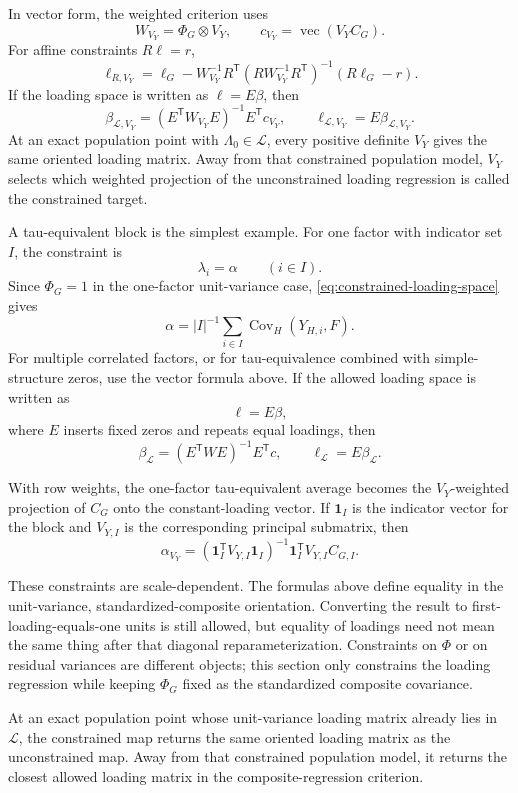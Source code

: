 \documentclass[11pt]{article}
\newcommand{\T}{^{\mathsf T}}
\newcommand{\Cov}{\operatorname{Cov}}
\theoremstyle{plain}
\theoremstyle{remark}
\begin{document}
In vector form, the weighted criterion uses
\[
  W_{V_Y}=\Phi_G\otimes V_Y,
  \qquad
  c_{V_Y}=\operatorname{vec}(V_YC_G).
\]
For affine constraints \(R\ell=r\),
\[
  \ell_{R,V_Y}
  =
  \ell_G
  -
  W_{V_Y}^{-1}R\T(RW_{V_Y}^{-1}R\T)^{-1}(R\ell_G-r).
\]
If the loading space is written as \(\ell=E\beta\), then
\[
  \beta_{\mathcal L,V_Y}
  =
  (E\T W_{V_Y}E)^{-1}E\T c_{V_Y},
  \qquad
  \ell_{\mathcal L,V_Y}=E\beta_{\mathcal L,V_Y}.
\]
At an exact population point with \(\Lambda_0\in\mathcal L\), every positive
definite \(V_Y\) gives the same oriented loading matrix. Away from that
constrained population model, \(V_Y\) selects which weighted projection of the
unconstrained loading regression is called the constrained target.

A tau-equivalent block is the simplest example. For one factor with indicator
set \(I\), the constraint is
\[
  \lambda_i=\alpha\qquad(i\in I).
\]
Since \(\Phi_G=1\) in the one-factor unit-variance case,
\eqref{eq:constrained-loading-space} gives
\[
  \alpha
  =
  |I|^{-1}\sum_{i\in I}\Cov_H(Y_{H,i},F).
\]
For multiple correlated factors, or for tau-equivalence combined with
simple-structure zeros, use the vector formula above. If the allowed loading
space is written as
\[
  \ell=E\beta ,
\]
where \(E\) inserts fixed zeros and repeats equal loadings, then
\[
  \beta_{\mathcal L}
  =
  (E\T W E)^{-1}E\T c,
  \qquad
  \ell_{\mathcal L}=E\beta_{\mathcal L}.
\]

With row weights, the one-factor tau-equivalent average becomes the
\(V_Y\)-weighted projection of \(C_G\) onto the constant-loading vector. If
\(\mathbf 1_I\) is the indicator vector for the block and \(V_{Y,I}\) is the
corresponding principal submatrix, then
\[
  \alpha_{V_Y}
  =
  (\mathbf 1_I\T V_{Y,I}\mathbf 1_I)^{-1}
  \mathbf 1_I\T V_{Y,I}C_{G,I}.
\]

These constraints are scale-dependent. The formulas above define equality in
the unit-variance, standardized-composite orientation. Converting the result to
first-loading-equals-one units is still allowed, but equality of loadings need
not mean the same thing after that diagonal reparameterization. Constraints on
\(\Phi\) or on residual variances are different objects; this section only
constrains the loading regression while keeping \(\Phi_G\) fixed as the
standardized composite covariance.

At an exact population point whose unit-variance loading matrix already lies in
\(\mathcal L\), the constrained map returns the same oriented loading matrix as
the unconstrained map. Away from that constrained population model, it returns
the closest allowed loading matrix in the composite-regression criterion.
\end{document}
